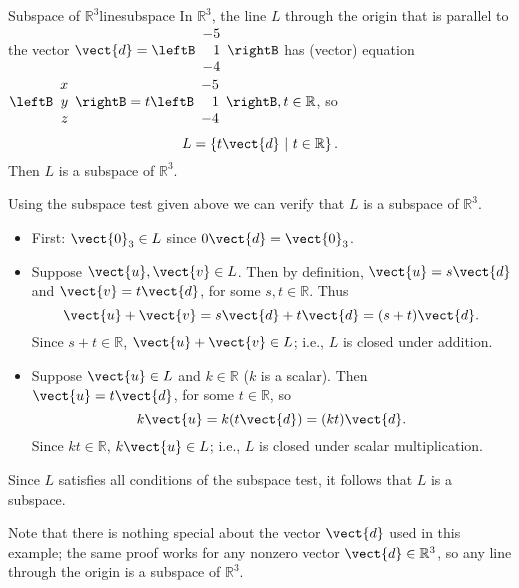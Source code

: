 \begin{example}{Subspace of $\mathbb{R}^3$}{linesubspace}
In $\mathbb{R}^3$, the line $L$ through the origin that is
parallel to the vector
${\vect{d}}= \leftB \begin{array}{r} -5 \\ 1 \\ -4 \end{array}\rightB$ 
has (vector) equation
$\leftB \begin{array}{r} x \\ y \\ z \end{array}\rightB
=t\leftB \begin{array}{r} -5 \\ 1 \\ -4 \end{array}\rightB, t\in\mathbb{R}$,
so 
\[ L=\left\{ t{\vect{d}} ~|~ t\in\mathbb{R}\right\}.\] Then $L$ is a subspace of $\mathbb{R}^3$.  
\end{example}

\begin{solution}
Using the subspace test given above we can verify that $L$ is a subspace of $\mathbb{R}^3$. 
\begin{itemize}
\item First: $\vect{0}_3\in L$ since $0\vect{d}=\vect{0}_3$.
\item Suppose $\vect{u},\vect{v}\in L$.
Then by definition, $\vect{u}=s\vect{d}$ and $\vect{v}=t\vect{d}$, 
for some $s,t\in\mathbb{R}$.
Thus
\[ \vect{u}+\vect{v} = s\vect{d}+t\vect{d} = (s+t)\vect{d}.\]
Since $s+t\in\mathbb{R}$, $\vect{u}+\vect{v}\in L$;
i.e., $L$ is closed under addition.
\item Suppose $\vect{u}\in L$ and $k\in\mathbb{R}$ ($k$ is a scalar).
Then $\vect{u}=t\vect{d}$, for some $t\in\mathbb{R}$, so
\[ k\vect{u}=k(t\vect{d})=(kt)\vect{d}.\]
Since $kt\in\mathbb{R}$, $k\vect{u}\in L$;
i.e., $L$ is closed under scalar multiplication.
\end{itemize}
Since $L$ satisfies all conditions of the subspace test, it follows that $L$ is a subspace. 
\end{solution}

Note that there is nothing special about the vector $\vect{d}$ used
in this example; the same proof works for any nonzero
vector $\vect{d}\in\mathbb{R}^3$, so any line through the origin is
a subspace of $\mathbb{R}^3$.

